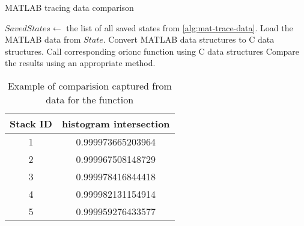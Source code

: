 \begin{algorithm}
	\caption{MATLAB tracing data comparison}\label{alg:mat-trace-compare}
	\begin{algorithmic}[1]
		\State \Input $SavedStates \gets$ the list of all saved
		states from \cref{alg:mat-trace-data}.
			\State Load the MATLAB data from $State$.
			\State Convert MATLAB data structures to C
			data structures.
			\State Call corresponding \gls{orionc}
				function using C data structures
			\State Compare the results using an
				appropriate method.
		\EndFor
	\end{algorithmic}
\end{algorithm}

\begin{table}
	\centering
	\begin{tabular}{cc}
		\toprule
		\be{}Stack ID     & \be{} histogram intersection \\
		\midrule
		1 & 0.999973665203964 \\
		2 & 0.999967508148729 \\
		3 & 0.999978416844418 \\
		4 & 0.999982131154914 \\
		5 & 0.999959276433577 \\
		\bottomrule
	\end{tabular}
	\caption{Example of comparision captured from data for the
		 function}\label{tbl:compare-Makefilter}
\end{table}


